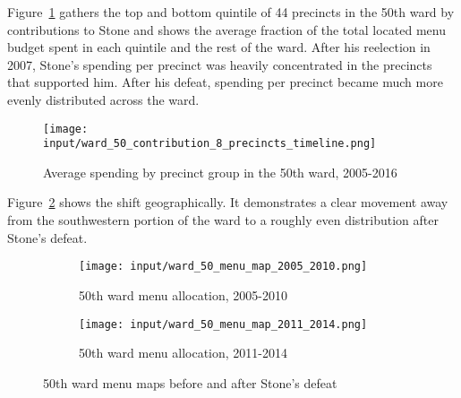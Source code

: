 Figure~\ref{fig:stone_spending_timeline} gathers the top and bottom quintile of 44 precincts in the 50th ward by contributions to Stone and shows the average fraction of the total located menu budget spent in each quintile and the rest of the ward.
After his reelection in 2007, Stone's spending per precinct was heavily concentrated in the precincts that supported him.
After his defeat, spending per precinct became much more evenly distributed across the ward.

\begin{figure}[H]
    \centering
    \texttt{[image: input/ward\_50\_contribution\_8\_precincts\_timeline.png]}
    \caption{Average spending by precinct group in the 50th ward, 2005-2016}
    \label{fig:stone_spending_timeline}
\end{figure}

Figure~\ref{fig:stone_spending_maps} shows the shift geographically. 
It demonstrates a clear movement away from the southwestern portion of the ward to a roughly even distribution after Stone's defeat.

\begin{figure}[H]
    \centering
    \begin{subfigure}[b]{0.45\textwidth} %
    \texttt{[image: input/ward\_50\_menu\_map\_2005\_2010.png]}
    \caption{50th ward menu allocation, 2005-2010}
    \end{subfigure}
    \hfill %
    \begin{subfigure}[b]{0.45\textwidth}
    \texttt{[image: input/ward\_50\_menu\_map\_2011\_2014.png]}
    \caption{50th ward menu allocation, 2011-2014}
    \end{subfigure}
    \caption{50th ward menu maps before and after Stone's defeat}
    \label{fig:stone_spending_maps}
\end{figure}

